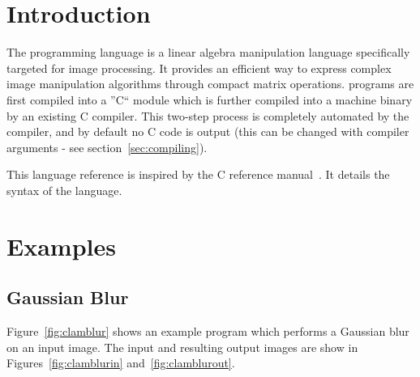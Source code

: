 \newcommand{\startsyn}{\begin{center}\begin{tabular}{l}}
\newcommand{\stopsyn}{\end{tabular}\end{center}}

\section{Introduction}
The \sys{} programming language is a linear algebra manipulation language
specifically targeted for image processing. It provides an efficient way to
express complex image manipulation algorithms through compact matrix
operations. \sys{} programs are first compiled into a ''C`` module which is
further compiled into a machine binary by an existing C compiler. This two-step
process is completely automated by the \sys{} compiler, and by default no C code
is output (this can be changed with compiler arguments - see section~\ref{sec:compiling}).

This language reference is inspired by the C reference manual~\cite{DBLP:KernighanR88}.
It details the syntax of the \sys{} language.









\clearpage
\section{Examples}

\subsection{Gaussian Blur}
Figure~\ref{fig:clamblur} shows an example \sys{} program which performs a Gaussian
blur on an input image. The input and resulting output images are show in
Figures~\ref{fig:clamblurin} and~\ref{fig:clamblurout}.

